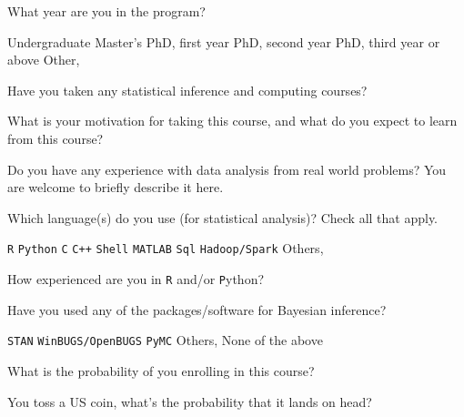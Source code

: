 \documentclass[12pt]{exam}
\begin{document}
\begin{questions}


\question What year are you in the program?
\begin{multicols}{2}
\begin{choices}
\choice Undergraduate
\choice Master's
\choice PhD, first year
\choice PhD, second year
\choice PhD, third year or above
\choice Other, \makebox[1.5in]{\hrulefill}
\end{choices}
\end{multicols}

\question Have you taken any statistical inference and computing courses?
\makeemptybox{1in}

\question What is your motivation for taking this course, and what do you expect to learn from this course?
\makeemptybox{1in}

\question Do you have any experience with data analysis from real world problems? You are welcome to briefly describe it here.
\makeemptybox{\fill}

\newpage
{%
\checkboxchar{$\Box$} %
\question  Which language(s) do you use (for statistical analysis)? Check all that apply.
\begin{multicols}{2}
\begin{checkboxes}
\choice \texttt{R}
\choice \texttt{Python}
\choice \texttt{C}
\choice \texttt{C++}
\choice \texttt{Shell}
\choice \texttt{MATLAB}
\choice \texttt{Sql}
\choice \texttt{Hadoop/Spark}
\choice Others, \makebox[1.5in]{\hrulefill}
\end{checkboxes}
\end{multicols}
}%

\question How experienced are you in \texttt R and/or \texttt Python?
\makeemptybox{1in}

{%
\checkboxchar{$\Box$} %
\question Have you used any of the packages/software for Bayesian inference?
\begin{multicols}{2}
\begin{checkboxes}
\choice \texttt{STAN}
\choice \texttt{WinBUGS/OpenBUGS}
\choice \texttt{PyMC}
\choice Others, \makebox[1.5in]{\hrulefill}
\choice None of the above
\end{checkboxes}
\end{multicols}
}%


\question What is the probability of you enrolling in this course?
\makeemptybox{1in}

\question You toss a US  coin, what's the probability that it lands on head?
\makeemptybox{1in}


\end{questions}
\end{document}
